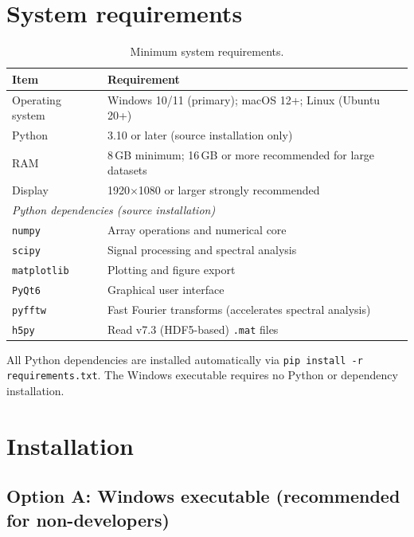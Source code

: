 \documentclass[11pt, a4paper]{report}
\begin{document}
\section{System requirements}

\begin{table}[htbp]
\centering
\caption{Minimum system requirements.}
\begin{tabular}{ll}
\toprule
\textbf{Item} & \textbf{Requirement} \\
\midrule
Operating system  & Windows 10/11 (primary); macOS 12+; Linux (Ubuntu 20+) \\
Python            & 3.10 or later (source installation only) \\
RAM               & 8\,GB minimum; 16\,GB or more recommended for large datasets \\
Display           & 1920$\times$1080 or larger strongly recommended \\
\midrule
\multicolumn{2}{l}{\textit{Python dependencies (source installation)}} \\
\midrule
\texttt{numpy}      & Array operations and numerical core \\
\texttt{scipy}      & Signal processing and spectral analysis \\
\texttt{matplotlib} & Plotting and figure export \\
\texttt{PyQt6}      & Graphical user interface \\
\texttt{pyfftw}     & Fast Fourier transforms (accelerates spectral analysis) \\
\texttt{h5py}       & Read v7.3 (HDF5-based) \texttt{.mat} files \\
\bottomrule
\end{tabular}
\end{table}

\begin{notebox}
All Python dependencies are installed automatically via \texttt{pip install -r requirements.txt}. The Windows executable requires no Python or dependency installation.
\end{notebox}

\section{Installation}

\subsection{Option A: Windows executable (recommended for non-developers)}
\end{document}
